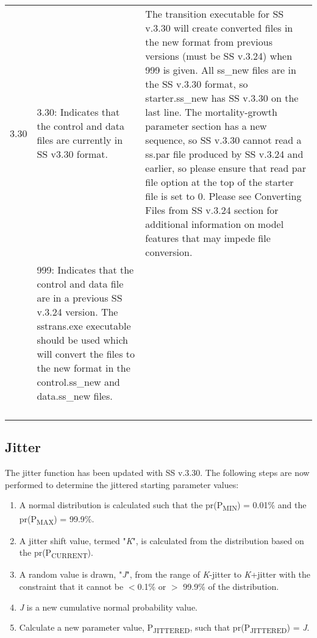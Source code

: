 {\begin{landscape}
\begin{longtable}{p{1.5cm} p{7cm} p{12.5cm}}
 
 \hline
 \hypertarget{Convert}{3.30} & 3.30: Indicates that the control and data files are currently in SS v3.30 format. 
	 & \multirow{1}{1cm}[-0.25cm]{\parbox{12.5cm}{The transition executable for SS v.3.30 will create converted files in the new format from previous versions (must be SS v.3.24) when 999 is given.  All ss\_new files are in the SS v.3.30 format, so starter.ss\_new has SS v.3.30 on the last line.  The mortality-growth parameter section has a new sequence, so SS v.3.30 cannot read a ss.par file produced by SS v.3.24 and earlier, so please ensure that read par file option at the top of the starter file is set to 0. Please see \hypertarget{ConvIssues}  {Converting Files from SS v.3.24} section for additional information on model features that may impede file conversion.}}\Tstrut\\
     & \multirow{1}{1cm}[-0.1cm]{\parbox{7cm}{999: Indicates that the control and data file are in a previous SS v.3.24 version.  The sstrans.exe executable should be used which will convert the files to the new format in the control.ss\_new and data.ss\_new files.}}  & \\  
     & & \\  
	   & & \\
     & & \\
   	 & & \\

\end{longtable}
\end{landscape}
}
\restoregeometry

\subsection{Jitter}
\hypertarget{Jitter}{}
The jitter function has been updated with SS v.3.30.  The following steps are now performed to determine the jittered starting parameter values:
\begin{enumerate}
	\item A normal distribution is calculated such that the pr(P\textsubscript{MIN}) = 0.01\% and the pr(P\textsubscript{MAX}) = 99.9\%.
	\item A jitter shift value, termed "\textit{K}", is calculated from the distribution based on the pr(P\textsubscript{CURRENT}).
	\item A random value is drawn, "\textit{J}", from the range of \textit{K}-jitter to \textit{K}+jitter with the constraint that it cannot be $<$0.1\% or $>$ 99.9\% of the distribution.
	\item \textit{J} is a new cumulative normal probability value.
	\item Calculate a new parameter value, P\textsubscript{JITTERED}, such that pr(P\textsubscript{JITTERED}) = \textit{J}.
\end{enumerate}

